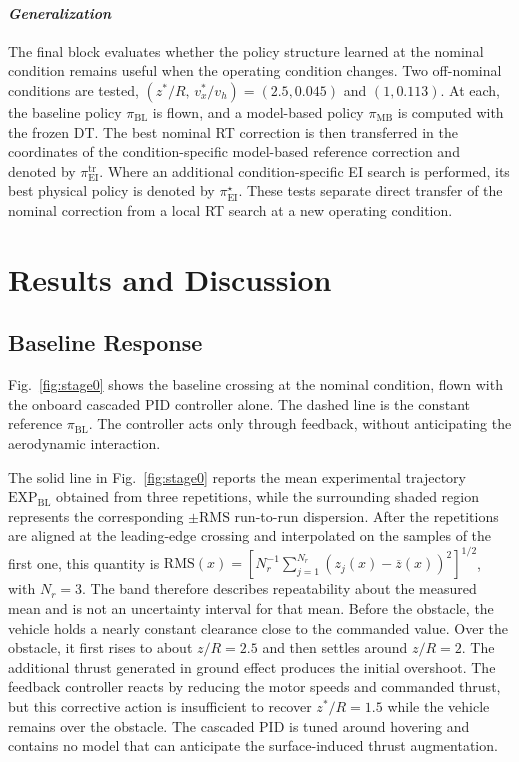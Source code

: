 \documentclass[journal]{IEEEtran}
\begin{document}
\paragraph*{\textit{Generalization}}
The final block evaluates whether the policy structure learned at the nominal condition remains useful when the operating condition changes. Two off-nominal conditions are tested, $(z^\ast/R,\,v_x^\ast/v_h)=(2.5,0.045)$ and $(1,0.113)$. At each, the baseline policy $\pi_{\mathrm{BL}}$ is flown, and a model-based policy $\pi_{\mathrm{MB}}$ is computed with the frozen DT. The best nominal RT correction is then transferred in the coordinates of the condition-specific model-based reference correction and denoted by $\pi_{\mathrm{EI}}^{\mathrm{tr}}$. Where an additional condition-specific EI search is performed, its best physical policy is denoted by $\pi_{\mathrm{EI}}^{\star}$. These tests separate direct transfer of the nominal correction from a local RT search at a new operating condition.


\section{Results and Discussion}
\label{sec:results}

\subsection{Baseline Response}
\label{sec:results-bl}

Fig.~\ref{fig:stage0} shows the baseline crossing at the nominal condition, flown with the onboard cascaded PID controller alone. The dashed line is the constant reference $\pi_{\mathrm{BL}}$. The controller acts only through feedback, without anticipating the aerodynamic interaction.

The solid line in Fig.~\ref{fig:stage0} reports the mean experimental trajectory $\mathrm{EXP}_{\mathrm{BL}}$ obtained from three repetitions, while the surrounding shaded region represents the corresponding $\pm\mathrm{RMS}$ run-to-run dispersion. After the repetitions are aligned at the leading-edge crossing and interpolated on the samples of the first one, this quantity is $\mathrm{RMS}(x)=[N_r^{-1}\sum_{j=1}^{N_r}(z_j(x)-\overline z(x))^2]^{1/2}$, with $N_r=3$. The band therefore describes repeatability about the measured mean and is not an uncertainty interval for that mean. Before the obstacle, the vehicle holds a nearly constant clearance close to the commanded value. Over the obstacle, it first rises to about $z/R=2.5$ and then settles around $z/R=2$. The additional thrust generated in ground effect produces the initial overshoot. The feedback controller reacts by reducing the motor speeds and commanded thrust, but this corrective action is insufficient to recover $z^*/R=1.5$ while the vehicle remains over the obstacle. The cascaded PID is tuned around hovering and contains no model that can anticipate the surface-induced thrust augmentation.
\end{document}
